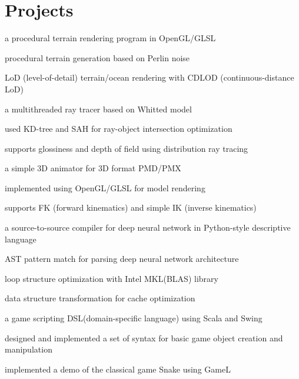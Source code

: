 \documentclass[]{deedy-resume-openfont}
\begin{document}
\begin{minipage}[t]{0.66\textwidth}
\section{Projects}

\begin{tightemize} 
\item a procedural terrain rendering program in OpenGL/GLSL
\item procedural terrain generation based on Perlin noise
\item LoD (level-of-detail) terrain/ocean rendering with CDLOD (continuous-distance LoD)
\end{tightemize}
\sectionsep

\begin{tightemize} 
\item a multithreaded ray tracer based on Whitted model
\item used KD-tree and SAH for ray-object intersection optimization
\item supports glossiness and depth of field using distribution ray tracing
\end{tightemize}
\sectionsep

\begin{tightemize} 
\item a simple 3D animator for 3D format PMD/PMX
\item implemented using OpenGL/GLSL for model rendering
\item supports FK (forward kinematics) and simple IK (inverse kinematics)
\end{tightemize}
\sectionsep

\begin{tightemize} 
\item a source-to-source compiler for deep neural network in Python-style descriptive language
\item AST pattern match for parsing deep neural network architecture
\item loop structure optimization with Intel MKL(BLAS) library
\item data structure transformation for cache optimization
\end{tightemize}
\sectionsep

\begin{tightemize} 
\item a game scripting DSL(domain-specific language) using Scala and Swing
\item designed and implemented a set of syntax for basic game object creation and manipulation
\item implemented a demo of the classical game Snake using GameL
\end{tightemize}
\sectionsep

\end{minipage} 
\end{document}
